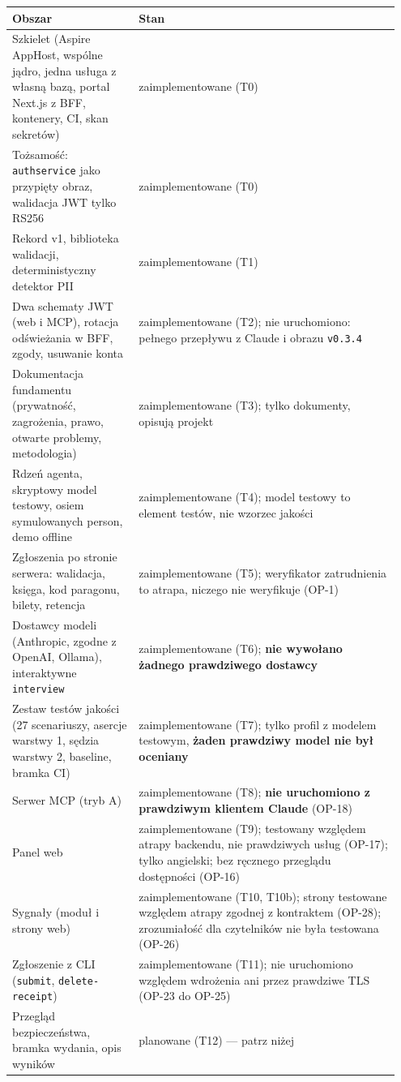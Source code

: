 \begin{longtable}{@{}p{0.31\linewidth}p{0.64\linewidth}@{}}
\toprule
Obszar & Stan \\
\midrule
\endhead
Szkielet (Aspire AppHost, wspólne jądro, jedna usługa z własną bazą, portal Next.js z BFF, kontenery, CI, skan sekretów) & zaimplementowane (T0) \\
Tożsamość: \texttt{authservice} jako przypięty obraz, walidacja JWT tylko RS256 & zaimplementowane (T0) \\
Rekord v1, biblioteka walidacji, deterministyczny detektor PII & zaimplementowane (T1) \\
Dwa schematy JWT (web i MCP), rotacja odświeżania w BFF, zgody, usuwanie konta & zaimplementowane (T2); nie uruchomiono: pełnego przepływu z Claude i obrazu \texttt{v0.3.4} \\
Dokumentacja fundamentu (prywatność, zagrożenia, prawo, otwarte problemy, metodologia) & zaimplementowane (T3); tylko dokumenty, opisują projekt \\
Rdzeń agenta, skryptowy model testowy, osiem symulowanych person, demo offline & zaimplementowane (T4); model testowy to element testów, nie wzorzec jakości \\
Zgłoszenia po stronie serwera: walidacja, księga, kod paragonu, bilety, retencja & zaimplementowane (T5); weryfikator zatrudnienia to atrapa, niczego nie weryfikuje (OP-1) \\
Dostawcy modeli (Anthropic, zgodne z OpenAI, Ollama), interaktywne \texttt{interview} & zaimplementowane (T6); \textbf{nie wywołano żadnego prawdziwego dostawcy} \\
Zestaw testów jakości (27 scenariuszy, asercje warstwy 1, sędzia warstwy 2, baseline, bramka CI) & zaimplementowane (T7); tylko profil z modelem testowym, \textbf{żaden prawdziwy model nie był oceniany} \\
Serwer MCP (tryb A) & zaimplementowane (T8); \textbf{nie uruchomiono z prawdziwym klientem Claude} (OP-18) \\
Panel web & zaimplementowane (T9); testowany względem atrapy backendu, nie prawdziwych usług (OP-17); tylko angielski; bez ręcznego przeglądu dostępności (OP-16) \\
Sygnały (moduł i strony web) & zaimplementowane (T10, T10b); strony testowane względem atrapy zgodnej z kontraktem (OP-28); zrozumiałość dla czytelników nie była testowana (OP-26) \\
Zgłoszenie z CLI (\texttt{submit}, \texttt{delete-receipt}) & zaimplementowane (T11); nie uruchomiono względem wdrożenia ani przez prawdziwe TLS (OP-23 do OP-25) \\
Przegląd bezpieczeństwa, bramka wydania, opis wyników & planowane (T12) --- patrz niżej \\
\bottomrule
\end{longtable}

